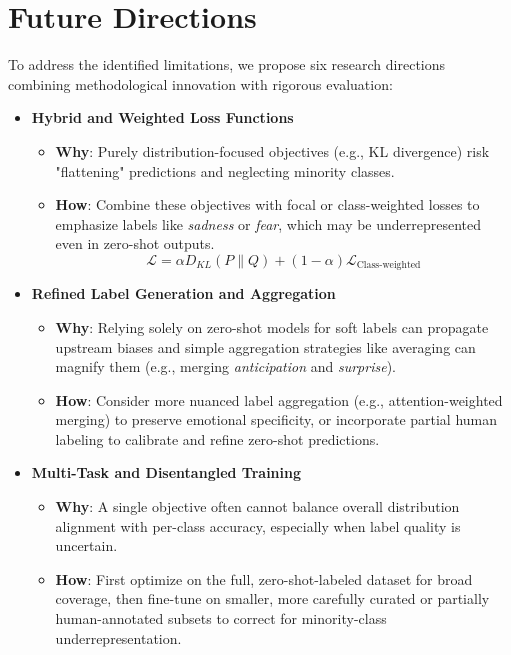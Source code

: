 \section{Future Directions}
To address the identified limitations, we propose six research directions combining methodological innovation with rigorous evaluation:

\begin{itemize}
    \item \textbf{Hybrid and Weighted Loss Functions}
    \begin{itemize}
        \item \textbf{Why}: Purely distribution-focused objectives (e.g., KL divergence) risk "flattening" predictions and neglecting minority classes.
        \item \textbf{How}: Combine these objectives with focal or class-weighted losses to emphasize labels like \textit{sadness} or \textit{fear}, which may be underrepresented even in zero-shot outputs.
        \begin{equation}
            \mathcal{L} = \alpha D_{KL}(P \parallel Q) + (1-\alpha)\mathcal{L}_{\text{Class-weighted}}
        \end{equation}
    \end{itemize}
    
    \item \textbf{Refined Label Generation and Aggregation}
    \begin{itemize}
        \item \textbf{Why}: Relying solely on zero-shot models for soft labels can propagate upstream biases and simple aggregation strategies like averaging can magnify them (e.g., merging \textit{anticipation} and \textit{surprise}).
        \item \textbf{How}: Consider more nuanced label aggregation (e.g., attention-weighted merging) to preserve emotional specificity, or incorporate partial human labeling to calibrate and refine zero-shot predictions.
    \end{itemize}
    
    \item \textbf{Multi-Task and Disentangled Training}
    \begin{itemize}
        \item \textbf{Why}: A single objective often cannot balance overall distribution alignment with per-class accuracy, especially when label quality is uncertain.
        \item \textbf{How}: First optimize on the full, zero-shot-labeled dataset for broad coverage, then fine-tune on smaller, more carefully curated or partially human-annotated subsets to correct for minority-class underrepresentation.
    \end{itemize}
    

\end{itemize}
